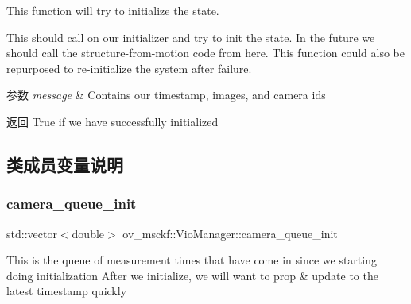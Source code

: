 This function will try to initialize the state. 

This should call on our initializer and try to init the state. In the future we should call the structure-\/from-\/motion code from here. This function could also be repurposed to re-\/initialize the system after failure.


\begin{DoxyParams}{参数}
{\em message} & Contains our timestamp, images, and camera ids \\
\hline
\end{DoxyParams}
\begin{DoxyReturn}{返回}
True if we have successfully initialized 
\end{DoxyReturn}


\subsection{类成员变量说明}
\mbox{\label{classov__msckf_1_1VioManager_a3d64db49753d6ae3ae946257c1a8e184}} 
\subsubsection{\texorpdfstring{camera\+\_\+queue\+\_\+init}{camera\_queue\_init}}
{\footnotesize\ttfamily std\+::vector$<$double$>$ ov\+\_\+msckf\+::\+Vio\+Manager\+::camera\+\_\+queue\+\_\+init\hspace{0.3cm}{\ttfamily [protected]}}

This is the queue of measurement times that have come in since we starting doing initialization After we initialize, we will want to prop \& update to the latest timestamp quickly 